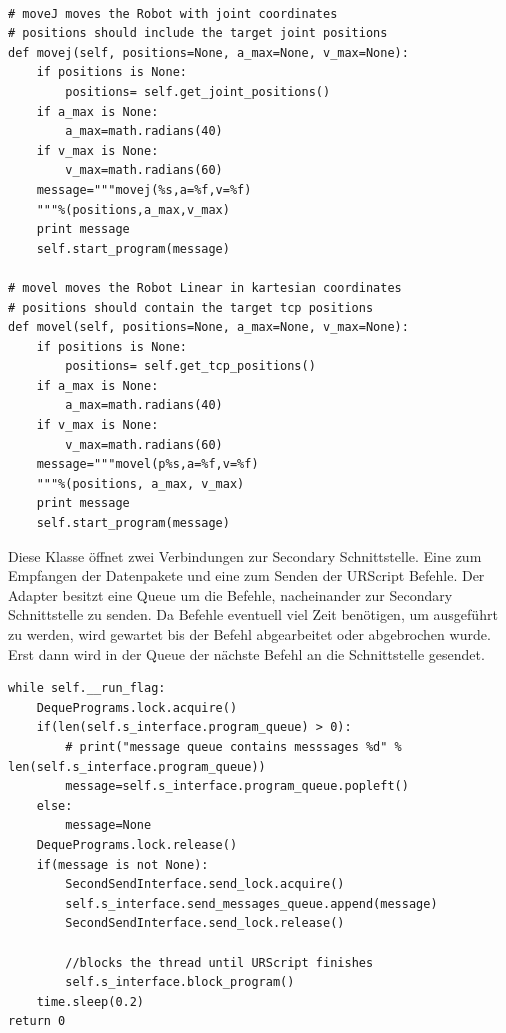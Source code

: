 \begin{lstlisting}[caption={Ausschnitt zeigt Funktionen die Scriptbefehle in der Adapter Klasse umgesetzt}, label=lst:urscipt_program_lst ,captionpos=b]

# moveJ moves the Robot with joint coordinates
# positions should include the target joint positions
def movej(self, positions=None, a_max=None, v_max=None):
    if positions is None:
        positions= self.get_joint_positions()
    if a_max is None:
        a_max=math.radians(40)
    if v_max is None:
        v_max=math.radians(60)
    message="""movej(%s,a=%f,v=%f)
    """%(positions,a_max,v_max)
    print message
    self.start_program(message)

# movel moves the Robot Linear in kartesian coordinates
# positions should contain the target tcp positions
def movel(self, positions=None, a_max=None, v_max=None):
    if positions is None:
        positions= self.get_tcp_positions()
    if a_max is None:
        a_max=math.radians(40)
    if v_max is None:
        v_max=math.radians(60)
    message="""movel(p%s,a=%f,v=%f)
    """%(positions, a_max, v_max)
    print message
    self.start_program(message)
\end{lstlisting}

Diese Klasse öffnet zwei Verbindungen zur Secondary Schnittstelle. Eine zum Empfangen der Datenpakete und eine zum Senden der URScript Befehle. Der Adapter besitzt eine \ac{Queue} um die Befehle, nacheinander zur Secondary Schnittstelle zu senden. Da Befehle eventuell viel Zeit benötigen, um ausgeführt zu werden, wird gewartet bis der Befehl abgearbeitet oder abgebrochen wurde. Erst dann wird in der Queue der nächste Befehl an die Schnittstelle gesendet.

\begin{lstlisting}[caption={Ausschnitt zeigt die Abarbeitung der Queue}, label=lst:adapter_queue ,captionpos=b] 
while self.__run_flag:
    DequePrograms.lock.acquire()
    if(len(self.s_interface.program_queue) > 0):
        # print("message queue contains messsages %d" % len(self.s_interface.program_queue))
        message=self.s_interface.program_queue.popleft()
    else:
        message=None
    DequePrograms.lock.release()
    if(message is not None):
        SecondSendInterface.send_lock.acquire()
        self.s_interface.send_messages_queue.append(message)
        SecondSendInterface.send_lock.release()

        //blocks the thread until URScript finishes
        self.s_interface.block_program()
    time.sleep(0.2)
return 0
\end{lstlisting}

